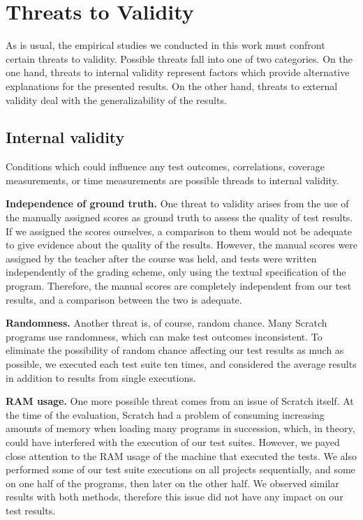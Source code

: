 \section{Threats to Validity}
\label{sec:threats_to_validity}

As is usual, the empirical studies we conducted in this work must confront certain threats to validity.
Possible threats fall into one of two categories.
On the one hand, threats to internal validity represent factors which provide alternative explanations for the presented results.
On the other hand, threats to external validity deal with the generalizability of the results.

\subsection{Internal validity}

Conditions which could influence any test outcomes, correlations, coverage measurements,
or time measurements are possible threads to internal validity.
\parspace

\textbf{Independence of ground truth.}
One threat to validity arises from the use of the manually assigned scores as
ground truth to assess the quality of test results.
If we assigned the scores ourselves,
a comparison to them would not be adequate to give evidence about the quality of the results.
However, the manual scores were assigned by the teacher after the course was held,
and tests were written independently of the grading scheme, only using the textual specification of the program.
Therefore, the manual scores are completely independent from our test results,
and a comparison between the two is adequate.
\parspace

\textbf{Randomness.}
Another threat is, of course, random chance.
Many Scratch programs use randomness, which can make test outcomes inconsistent.
To eliminate the possibility of random chance affecting our test results as much as possible, we executed each test suite ten times,
and considered the average results in addition to results from single executions.
\parspace

\textbf{RAM usage.}
One more possible threat comes from an issue of Scratch itself.
At the time of the evaluation, Scratch had a problem of consuming increasing amounts of memory when loading many programs in succession,
which, in theory, could have interfered with the execution of our test suites.
However, we payed close attention to the RAM usage of the machine that executed the tests.
We also performed some of our test suite executions on all projects sequentially,
and some on one half of the programs, then later on the other half.
We observed similar results with both methods, therefore this issue did not have any impact on our test results.
\parspace


